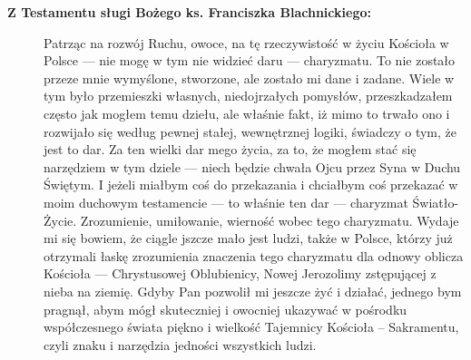 \documentclass[a5paper,10pt,polish]{book}
\begin{document}
\begin{description}
\item[{\textbf{Z Testamentu sługi Bożego ks. Franciszka Blachnickiego:}}] \leavevmode
Patrząc na rozwój Ruchu, owoce, na tę rzeczywistość  w życiu Kościoła w Polsce  — nie mogę  w tym nie widzieć daru — charyzmatu. To nie zostało przeze mnie wymyślone, stworzone, ale zostało mi dane i zadane. Wiele w tym było przemieszki własnych, niedojrzałych pomysłów, przeszkadzałem często jak mogłem temu dziełu, ale właśnie fakt, iż mimo to trwało ono i rozwijało się według pewnej stałej, wewnętrznej logiki, świadczy o tym, że jest to dar.
Za ten wielki dar mego życia, za to, że  mogłem stać się narzędziem  w tym dziele — niech będzie chwała Ojcu przez Syna w Duchu Świętym.
I jeżeli  miałbym coś do przekazania  i chciałbym coś przekazać w moim duchowym testamencie — to właśnie ten dar — charyzmat Światło-Życie. Zrozumienie,  umiłowanie, wierność  wobec  tego  charyzmatu. Wydaje mi się bowiem, że ciągle  jszcze mało jest ludzi, także w Polsce, którzy już otrzymali łaskę zrozumienia  znaczenia tego charyzmatu dla odnowy oblicza Kościoła — Chrystusowej Oblubienicy, Nowej Jerozolimy zstępującej  z nieba na ziemię.
Gdyby Pan pozwolił mi jeszcze żyć i działać, jednego bym pragnął, abym mógł skuteczniej i owocniej ukazywać w pośrodku  współczesnego świata piękno i wielkość Tajemnicy Kościoła – Sakramentu, czyli znaku i narzędzia jedności wszystkich ludzi.

\end{description}



\renewcommand{\indexname}{Indeks}
\printindex
\end{document}

